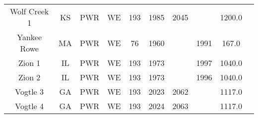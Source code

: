 \begin{table}
\begin{tabular}{c c c c c c c c c c}
    Wolf Creek 1 & KS & PWR & WE & 193 & 1985 & 2045 &  & 1200.0 \\
    Yankee Rowe & MA & PWR & WE & 76 & 1960 &  & 1991 & 167.0 \\
    Zion 1 & IL & PWR & WE & 193 & 1973 &  & 1997 & 1040.0 \\
    Zion 2 & IL & PWR & WE & 193 & 1973 &  & 1996 & 1040.0 \\
    Vogtle 3 & GA & PWR & WE & 193 & 2023 & 2062 &  & 1117.0 \\
    Vogtle 4 & GA & PWR & WE & 193 & 2024 & 2063 &  & 1117.0 \\
    \hline
    \end{tabular}
\end{table}

